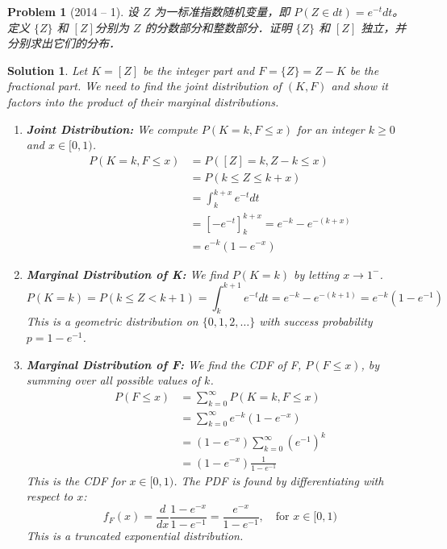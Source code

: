 \documentclass[12pt]{amsart}
\newtheorem{problem}{Problem}
\newtheorem*{solution}{Solution}
\begin{document}
\begin{problem}[2014 -- 1]
设 $Z$ 为一标准指数随机变量，即 $P(Z \in d t)=e^{-t} d t$。定义 $\{Z\}$ 和 $[Z]$分别为 $Z$ 的分数部分和整数部分．证明 $\{Z\}$ 和 $[Z]$ 独立，并分别求出它们的分布．
\end{problem}

\begin{solution}
Let $K = [Z]$ be the integer part and $F = \{Z\} = Z - K$ be the fractional part. We need to find the joint distribution of $(K, F)$ and show it factors into the product of their marginal distributions.

\begin{enumerate}
    \item \textbf{Joint Distribution:} We compute $P(K=k, F \leq x)$ for an integer $k \geq 0$ and $x \in [0, 1)$.
    \begin{align*}
        P(K=k, F \leq x) &= P([Z]=k, Z-k \leq x) \\
        &= P(k \leq Z \leq k+x) \\
        &= \int_k^{k+x} e^{-t} dt \\
        &= [-e^{-t}]_k^{k+x} = e^{-k} - e^{-(k+x)} \\
        &= e^{-k}(1 - e^{-x})
    \end{align*}

    \item \textbf{Marginal Distribution of K:} We find $P(K=k)$ by letting $x \to 1^-$.
    $$ P(K=k) = P(k \leq Z < k+1) = \int_k^{k+1} e^{-t} dt = e^{-k} - e^{-(k+1)} = e^{-k}(1-e^{-1}) $$
    This is a geometric distribution on $\{0, 1, 2, \ldots\}$ with success probability $p = 1-e^{-1}$.

    \item \textbf{Marginal Distribution of F:} We find the CDF of F, $P(F \leq x)$, by summing over all possible values of $k$.
    \begin{align*}
        P(F \leq x) &= \sum_{k=0}^{\infty} P(K=k, F \leq x) \\
        &= \sum_{k=0}^{\infty} e^{-k}(1-e^{-x}) \\
        &= (1-e^{-x}) \sum_{k=0}^{\infty} (e^{-1})^k \\
        &= (1-e^{-x}) \frac{1}{1-e^{-1}}
    \end{align*}
    This is the CDF for $x \in [0, 1)$. The PDF is found by differentiating with respect to $x$:
    $$ f_F(x) = \frac{d}{dx} \frac{1-e^{-x}}{1-e^{-1}} = \frac{e^{-x}}{1-e^{-1}}, \quad \text{for } x \in [0,1) $$
    This is a truncated exponential distribution.


\end{enumerate}
\end{solution}
\end{document}
